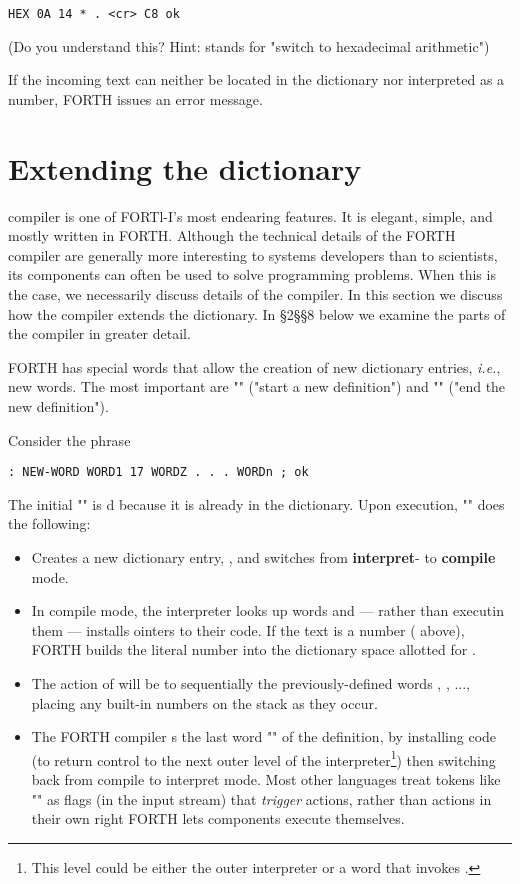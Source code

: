 \begin{lstlisting}
HEX 0A 14 * . <cr> C8 ok
\end{lstlisting}

(Do you understand this? Hint:  stands for "switch to hexadecimal arithmetic")

If the incoming text can neither be located in the dictionary nor interpreted as a number, FORTH issues an error message.


\section{Extending the dictionary}

 compiler is one of FORTl-I’s most endearing features. It is elegant, simple, and mostly written in FORTH. Although the technical details of the FORTH compiler are generally more interesting to systems developers than to scientists, its components can often be used to solve programming problems. When this is the case, we necessarily discuss details of the compiler. In this section we discuss how the compiler extends the dictionary. In §2§§8 below we examine the parts of the compiler in greater detail.

FORTH has special words that allow the creation of new dictionary entries, \textit{i.e.}, new words. The most important are "\bc{:}" ("start a new definition") and "\bc{;}" ("end the new definition").

Consider the phrase

\begin{lstlisting}
: NEW-WORD WORD1 17 WORDZ . . . WORDn ; ok
\end{lstlisting}

The initial "\bc{:}" is d because it is already in the dictionary. Upon execution, "\bc{:}" does the following:

\begin{itemize}
    \item Creates a new dictionary entry, , and switches from \textbf{interpret}- to \textbf{compile} mode.
    \item In compile mode, the interpreter looks up words and — rather than executin them — installs ointers to their code. If the text is a number ( above), FORTH builds the literal number into the dictionary space allotted for .
    \item The action of  will be to  sequentially the previously-defined words , , ..., placing any built-in numbers on the stack as they occur.
    \item The FORTH compiler s the last word "\bc{;}" of the definition, by installing code (to return control to the next outer level of the interpreter\footnote{This level could be either the outer interpreter or a word that invokes .}) then switching back from compile to interpret mode. Most other languages treat tokens like "\bc{;}" as ﬂags (in the input stream) that \textit{trigger} actions, rather than actions in their own right FORTH lets components execute themselves.
\end{itemize}

